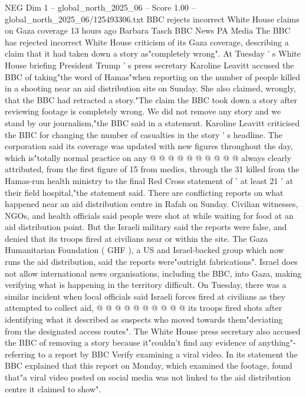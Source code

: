 \begin{textsample}{NEG Dim 1 – global\_north\_2025\_06 – Score 1.00 – global\_north\_2025\_06/125493306.txt}  \label{ex:f1_neg_119}
BBC rejects incorrect White House claims on Gaza coverage 13 hours ago Barbara Tasch BBC News PA Media The BBC has rejected incorrect White House criticism of its Gaza coverage, describing a claim that it had taken down a story as"completely wrong".
At Tuesday ' s White House briefing President Trump ' s press secretary Karoline Leavitt accused the BBC of taking"the word of Hamas"when reporting on the number of people killed in a shooting near an aid distribution site on Sunday.
She also claimed, wrongly, that the BBC had retracted a story."The claim the BBC took down a story after reviewing footage is completely wrong.
We did not remove any story and we stand by our journalism,"the BBC said in a statement.
Karoline Leavitt criticised the BBC for changing the number of casualties in the story ' s headline.
The corporation said its coverage was updated with new figures throughout the day, which is"totally normal practice on any @ @ @ @ @ @ @ @ @ @ always clearly attributed, from the first figure of 15 from medics, through the 31 killed from the Hamas-run health ministry to the final Red Cross statement of ' at least 21 ' at their field hospital,"the statement said.
There are conflicting reports on what happened near an aid distribution centre in Rafah on Sunday.
Civilian witnesses, NGOs, and health officials said people were shot at while waiting for food at an aid distribution point.
But the Israeli military said the reports were false, and denied that its troops fired at civilians near or within the site.
The Gaza Humanitarian Foundation ( GHF ), a US and Israel-backed group which now runs the aid distribution, said the reports were"outright fabrications".
Israel does not allow international news organisations, including the BBC, into Gaza, making verifying what is happening in the territory difficult.
On Tuesday, there was a similar incident when local officials said Israeli forces fired at civilians as they attempted to collect aid, @ @ @ @ @ @ @ @ @ @ its troops fired shots after identifying what it described as suspects who moved towards them"deviating from the designated access routes".
The White House press secretary also accused the BBC of removing a story because it"couldn't find any evidence of anything"- referring to a report by BBC Verify examining a viral video.
In its statement the BBC explained that this report on Monday, which examined the footage, found that"a viral video posted on social media was not linked to the aid distribution centre it claimed to show".

\end{textsample}

